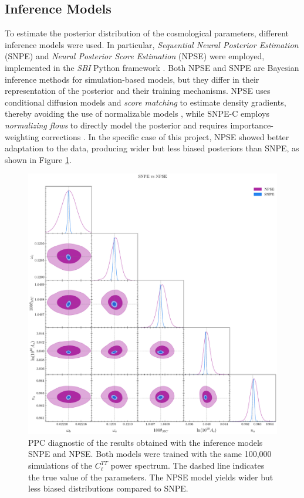 \subsection{Inference Models}
To estimate the posterior distribution of the cosmological parameters, different inference models were used. In particular, \textit{Sequential Neural Posterior Estimation} \cite{SNPE_C} (SNPE) and \textit{Neural Posterior Score Estimation} (NPSE) \cite{NPSE_1} \cite{NPSE_2} were employed, implemented in the \textit{SBI} Python framework \cite{SBI}. Both NPSE and SNPE are Bayesian inference methods for simulation-based models, but they differ in their representation of the posterior and their training mechanisms. NPSE uses conditional diffusion models and \textit{score matching} to estimate density gradients, thereby avoiding the use of normalizable models \cite{NPSE_1}, while SNPE-C employs \textit{normalizing flows} to directly model the posterior and requires importance-weighting corrections \cite{SNPE_C}. In the specific case of this project, NPSE showed better adaptation to the data, producing wider but less biased posteriors than SNPE, as shown in Figure \ref{fig:model_comparison}.  

\begin{figure}
    \centering
    \includegraphics[scale=0.35]{img/inference_model_comparison.pdf}
    \caption{PPC diagnostic of the results obtained with the inference models SNPE and NPSE. Both models were trained with the same 100,000 simulations of the $C_{\ell}^{TT}$ power spectrum. The dashed line indicates the true value of the parameters. The NPSE model yields wider but less biased distributions compared to SNPE.}
    \label{fig:model_comparison}
\end{figure}

